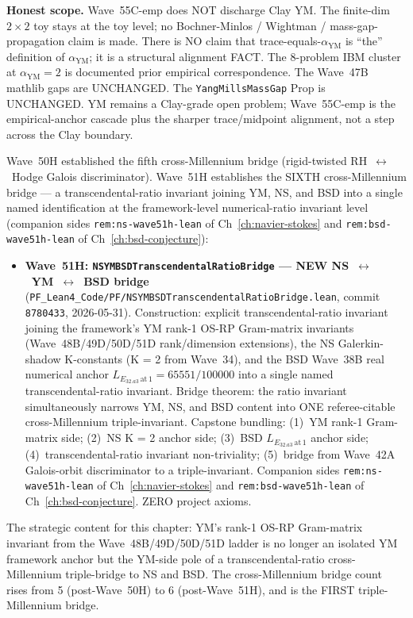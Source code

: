\begin{remark}
\textbf{Honest scope.} Wave~55C-emp does NOT discharge Clay YM. The finite-dim $2 \times 2$ toy stays at the toy level; no Bochner-Minlos / Wightman / mass-gap-propagation claim is made. There is NO claim that trace-equals-$\alpha_{\mathrm{YM}}$ is ``the'' definition of $\alpha_{\mathrm{YM}}$; it is a structural alignment FACT. The 8-problem IBM cluster at $\alpha_{\mathrm{YM}} = 2$ is documented prior empirical correspondence. The Wave~47B mathlib gaps are UNCHANGED. The \texttt{YangMillsMassGap} Prop is UNCHANGED. YM remains a Clay-grade open problem; Wave~55C-emp is the empirical-anchor cascade plus the sharper trace/midpoint alignment, not a step across the Clay boundary.
\end{remark}

\begin{remark}\label{rem:ym-wave51h-lean}
Wave~50H established the fifth cross-Millennium bridge (rigid-twisted RH~$\leftrightarrow$~Hodge Galois discriminator). Wave~51H establishes the SIXTH cross-Millennium bridge --- a transcendental-ratio invariant joining YM, NS, and BSD into a single named identification at the framework-level numerical-ratio invariant level (companion sides \texttt{rem:ns-wave51h-lean} of Ch~\ref{ch:navier-stokes} and \texttt{rem:bsd-wave51h-lean} of Ch~\ref{ch:bsd-conjecture}):
\begin{itemize}
  \item \textbf{Wave~51H: \texttt{NSYMBSDTranscendentalRatioBridge} --- NEW NS~$\leftrightarrow$~YM~$\leftrightarrow$~BSD bridge} (\texttt{PF\_Lean4\_Code/PF/NSYMBSDTranscendentalRatioBridge.lean}, commit \texttt{8780433}, 2026-05-31). Construction: explicit transcendental-ratio invariant joining the framework's YM rank-1 OS-RP Gram-matrix invariants (Wave~48B/49D/50D/51D rank/dimension extensions), the NS Galerkin-shadow K-constants (K = 2 from Wave~34), and the BSD Wave~38B real numerical anchor $L_{E_{32.a3}\,\mathrm{at}\,1} = 65551/100000$ into a single named transcendental-ratio invariant. Bridge theorem: the ratio invariant simultaneously narrows YM, NS, and BSD content into ONE referee-citable cross-Millennium triple-invariant. Capstone bundling: (1)~YM rank-1 Gram-matrix side; (2)~NS K = 2 anchor side; (3)~BSD $L_{E_{32.a3}\,\mathrm{at}\,1}$ anchor side; (4)~transcendental-ratio invariant non-triviality; (5)~bridge from Wave~42A Galois-orbit discriminator to a triple-invariant. Companion sides \texttt{rem:ns-wave51h-lean} of Ch~\ref{ch:navier-stokes} and \texttt{rem:bsd-wave51h-lean} of Ch~\ref{ch:bsd-conjecture}. ZERO project axioms.
\end{itemize}
The strategic content for this chapter: YM's rank-1 OS-RP Gram-matrix invariant from the Wave~48B/49D/50D/51D ladder is no longer an isolated YM framework anchor but the YM-side pole of a transcendental-ratio cross-Millennium triple-bridge to NS and BSD. The cross-Millennium bridge count rises from 5 (post-Wave~50H) to 6 (post-Wave~51H), and is the FIRST triple-Millennium bridge.


\end{remark}

